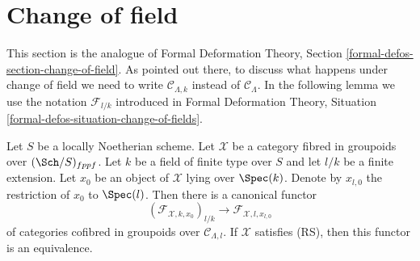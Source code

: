 \section{Change of field}
\label{section-change-of-field}

\noindent
This section is the analogue of
Formal Deformation Theory, Section \ref{formal-defos-section-change-of-field}.
As pointed out there, to discuss what happens under change of field
we need to write $\mathcal{C}_{\Lambda, k}$ instead of $\mathcal{C}_\Lambda$.
In the following lemma we use the notation $\mathcal{F}_{l/k}$
introduced in Formal Deformation Theory, Situation
\ref{formal-defos-situation-change-of-fields}.

\begin{lemma}
\label{lemma-change-of-field}
Let $S$ be a locally Noetherian scheme. Let $\mathcal{X}$ be a category
fibred in groupoids over $(\Sch/S)_{fppf}$. Let $k$ be a
field of finite type over $S$ and let $l/k$ be a finite extension.
Let $x_0$ be an object of $\mathcal{X}$ lying over $\Spec(k)$.
Denote by $x_{l, 0}$ the restriction of $x_0$ to $\Spec(l)$.
Then there is a canonical functor
$$
(\mathcal{F}_{\mathcal{X}, k , x_0})_{l/k}
\longrightarrow
\mathcal{F}_{\mathcal{X}, l, x_{l, 0}}
$$
of categories cofibred in groupoids over $\mathcal{C}_{\Lambda, l}$.
If $\mathcal{X}$ satisfies (RS), then this functor is an equivalence.
\end{lemma}

